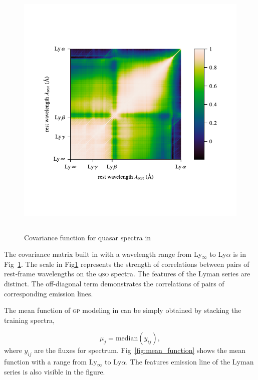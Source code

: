 \documentclass{ar-1col}
\begin{document}
\begin{figure}
    \includegraphics[width=5in, height=5in]{images/covariance.pdf}
    \caption{Covariance function for quasar spectra in \citet{Garnett17}}
    \label{fig:covariance}
\end{figure}

The covariance matrix built in \citet{Garnett17} with a wavelength range from Ly$_\infty$ to Ly$\alpha$ is in Fig~\ref{fig:covariance}. 
The scale in Fig\ref{fig:covariance} represents the strength of correlations between pairs of rest-frame wavelengths on the \textsc{qso} spectra.
The features of the Lyman series are distinct.
The off-diagonal term demonstrates the correlations of pairs of corresponding emission lines.

The mean function of \textsc{gp} modeling in \citet{Garnett17} can be simply obtained by stacking the training spectra, 

\begin{equation}
    \mu_j = \mathrm{median } (y_{ij}),
\end{equation}
where $y_{ij}$ are the fluxes for spectrum. Fig~\ref{fig:mean_function} shows the mean function with a range from Ly$_\infty$ to Ly$\alpha$. 
The features emission line of the Lyman series is also visible in the figure.
\end{document}
